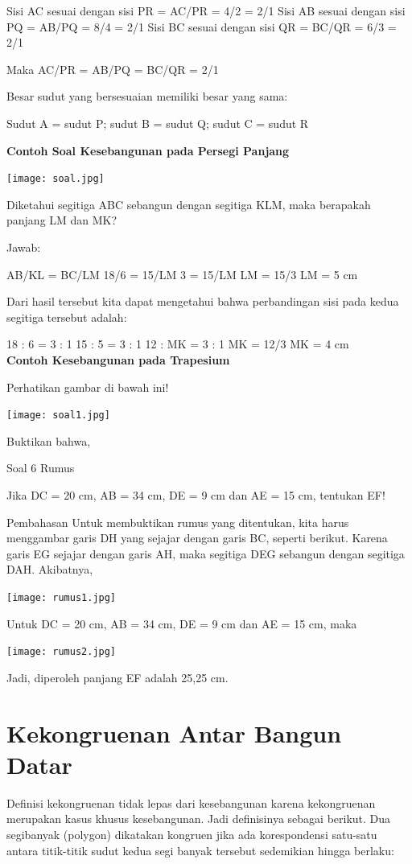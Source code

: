 \documentclass[11pt,fleqn]{book} %
\begin{document}
Sisi AC sesuai dengan sisi PR = AC/PR = 4/2 = 2/1
Sisi AB sesuai dengan sisi PQ = AB/PQ = 8/4 = 2/1
Sisi BC sesuai dengan sisi QR = BC/QR = 6/3 = 2/1

Maka AC/PR = AB/PQ = BC/QR = 2/1


Besar sudut yang bersesuaian memiliki besar yang sama:

Sudut A = sudut P; sudut B = sudut Q; sudut C = sudut R

\textbf{Contoh Soal Kesebangunan pada Persegi Panjang}


\texttt{[image: soal.jpg]}


Diketahui segitiga ABC sebangun dengan segitiga KLM, maka berapakah panjang LM dan MK?

Jawab:

AB/KL = BC/LM
18/6  = 15/LM
   3  = 15/LM
   LM = 15/3
   LM = 5 cm

Dari hasil tersebut kita dapat mengetahui bahwa perbandingan sisi pada kedua segitiga tersebut adalah:

18 : 6 = 3 : 1
15 : 5 = 3 : 1
12 : MK = 3 : 1
MK = 12/3
MK = 4 cm
\\

\textbf{Contoh Kesebangunan pada Trapesium}

Perhatikan gambar di bawah ini!

\texttt{[image: soal1.jpg]}

Buktikan bahwa,

Soal 6 Rumus

Jika DC = 20 cm, AB = 34 cm, DE = 9 cm dan AE = 15 cm, tentukan EF!

Pembahasan Untuk membuktikan rumus yang ditentukan, kita harus menggambar garis DH yang sejajar dengan garis BC, seperti berikut.
Karena garis EG sejajar dengan garis AH, maka segitiga DEG sebangun dengan segitiga DAH. Akibatnya,

\texttt{[image: rumus1.jpg]}

Untuk DC = 20 cm, AB = 34 cm, DE = 9 cm dan AE = 15 cm, maka

\texttt{[image: rumus2.jpg]}

Jadi, diperoleh panjang EF adalah 25,25 cm.

\section{Kekongruenan Antar Bangun Datar}

Definisi kekongruenan tidak lepas dari kesebangunan karena kekongruenan
merupakan kasus khusus kesebangunan. Jadi definisinya sebagai berikut.
Dua segibanyak (polygon) dikatakan kongruen jika ada korespondensi satu-satu
antara titik-titik sudut kedua segi banyak tersebut sedemikian hingga berlaku: 
\end{document}
